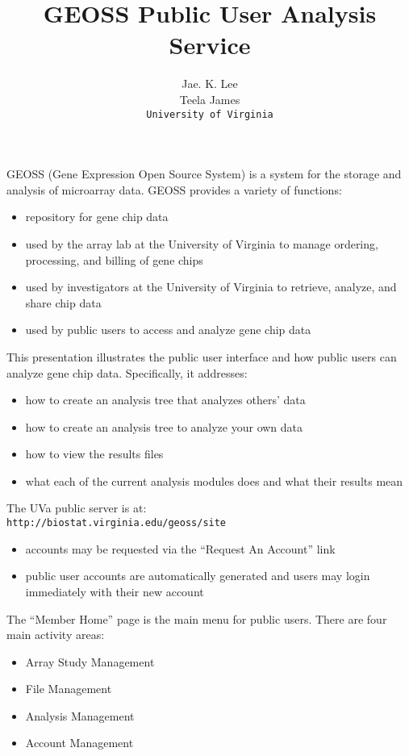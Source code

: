 \documentclass{compactslide} %
\author{Jae. K. Lee \\
Teela James \\
\texttt{University of Virginia}}
\title{GEOSS Public User Analysis Service}
\date{}
\begin{document}
\titleslide

\begin{slide}
GEOSS (Gene Expression Open Source System) is a system for the storage
and analysis of microarray data.  GEOSS provides a variety of functions:
\begin{itemize}
\item repository for gene chip data
\item used by the array lab at the University of Virginia to manage
    ordering, processing, and billing of gene chips 
\item used by investigators at the University of Virginia to retrieve,
    analyze, and share chip data
\item used by public users to access and analyze gene chip data
\end{itemize}
\end{slide}

\begin{slide}
This presentation illustrates the public user interface and how
public users can analyze gene chip data.  Specifically, it addresses:
\begin{itemize}
\item how to create an analysis tree that analyzes others' data
\item how to create an analysis tree to analyze your own data
\item how to view the results files
\item what each of the current analysis modules does and what their
    results mean
\end{itemize}
\end{slide}

\begin{slide}

The UVa public server is at: \\
\texttt{http://biostat.virginia.edu/geoss/site}
\begin{itemize}
\item accounts may be requested via the ``Request An Account'' link
\item public user accounts are automatically generated and users may login
    immediately with their new account
\end{itemize}
\end{slide}

\begin{slide}
The ``Member Home'' page is the main menu for public users. There are four 
main activity areas:
\begin{itemize}
\item Array Study Management
\item File Management
\item Analysis Management
\item Account Management
\end{itemize}
\end{slide}
\end{document}
